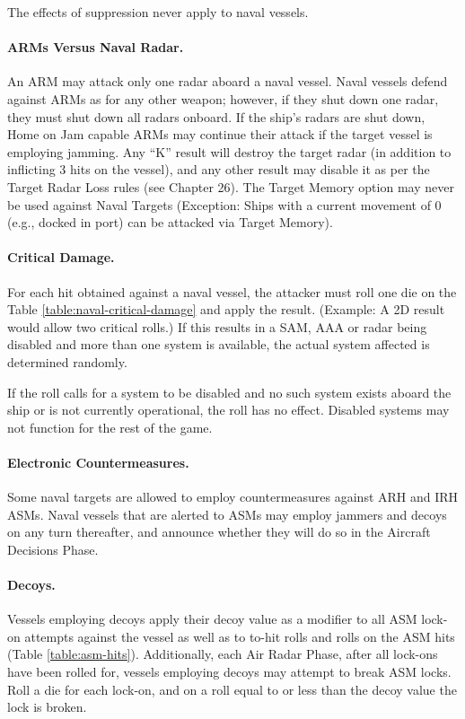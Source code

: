 The effects of suppression never apply to naval vessels. 

\paragraph{ARMs Versus Naval Radar.}  An ARM may attack only one radar aboard a naval vessel.  Naval vessels defend against ARMs as for any other weapon; however, if they shut down one radar, they must shut down all radars onboard.  If the ship's radars are shut down, Home on Jam capable ARMs may continue their attack if the target vessel is employing jamming.   Any “K” result will destroy the target radar (in addition to inflicting 3 hits on the vessel), and any other result may disable it as per the Target Radar Loss rules (see Chapter 26).  The Target Memory option may never be used against Naval Targets (Exception: Ships with a current movement of 0 (e.g., docked in port) can be attacked via Target Memory).


\paragraph{Critical Damage.} For each hit obtained against a naval vessel, the attacker must roll one die on the Table \ref{table:naval-critical-damage} and apply the result.  (Example: A 2D result would allow two critical rolls.)   If this results in a SAM, AAA or radar being disabled and more than one system is available, the actual system affected is determined randomly.

If the roll calls for a system to be disabled and no such system exists aboard the ship or is not currently operational, the roll has no effect.  Disabled systems may not function for the rest of the game.



\paragraph{Electronic Countermeasures.}  Some naval targets are allowed to employ countermeasures against ARH and IRH ASMs.  Naval vessels that are alerted to ASMs may employ jammers and decoys on any turn thereafter, and announce whether they will do so in the Aircraft Decisions Phase.


\paragraph{Decoys.} \label{rule:asm-decoys} Vessels employing decoys apply their decoy value as a modifier to all ASM lock-on attempts against the vessel as well as to to-hit rolls and rolls on the ASM hits (Table \ref{table:asm-hits}).  Additionally, each Air Radar Phase, after all lock-ons have been rolled for, vessels employing decoys may attempt to break ASM locks.   Roll a die for each lock-on, and on a roll equal to or less than the decoy value the lock is broken.

